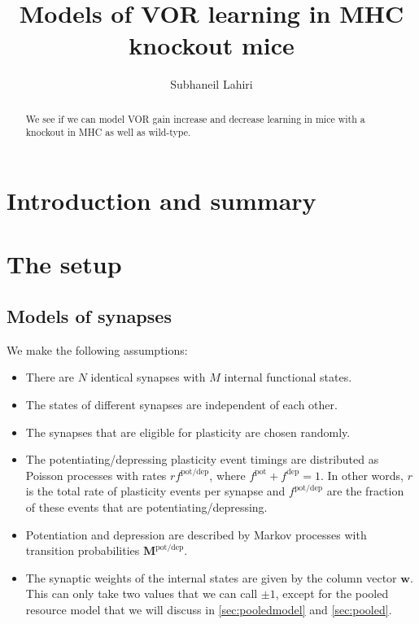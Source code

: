 \documentclass[12pt]{article}
\title{Models of VOR learning in MHC knockout mice}
\author{Subhaneil Lahiri
%
}
\newcommand{\w}{\mathbf{w}}
\newcommand{\M}{\mathbf{M}}
\newcommand{\pot}{^{\text{pot}}}
\newcommand{\dep}{^{\text{dep}}}
\newcommand{\potdep}{^{\text{pot/dep}}}
\begin{document}
\maketitle




\begin{abstract}
  We see if we can model VOR gain increase and decrease learning in mice with a knockout in MHC as well as wild-type.
\end{abstract}

\tableofcontents


\section{Introduction and summary}\label{sec:intro}




\section{The setup}\label{sec:setup}


\subsection{Models of synapses}\label{sec:synapse}

We make the following assumptions:
\begin{itemize}
  \item There are $N$ identical synapses with $M$ internal functional states.
  \item The states of different synapses are independent of each other.
  \item The synapses that are eligible for plasticity are chosen randomly.
  \item The potentiating/depressing plasticity event timings are distributed as Poisson processes with rates $rf\potdep$, where $f\pot+f\dep=1$.
      In other words, $r$ is the total rate of plasticity events per synapse and $f\potdep$ are the fraction of these events that are potentiating/depressing.
  \item Potentiation and depression are described by Markov processes with transition probabilities $\M\potdep$.
  \item The synaptic weights of the internal states are given by the column vector $\w$. This can only take two values that we can call $\pm1$, except for the pooled resource model that we will discuss in \autoref{sec:pooledmodel} and \autoref{sec:pooled}.
\end{itemize}
\end{document}
